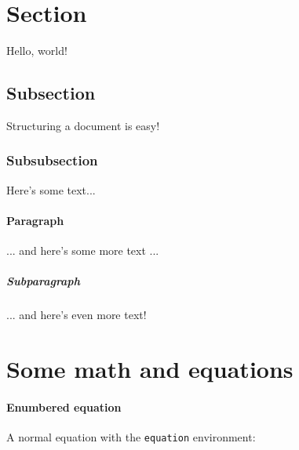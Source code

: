 \documentclass{article}
\begin{document}
\doublespacing          %

\maketitle
\newpage

\tableofcontents
\newpage

\listoffigures
\newpage

\listoftables
\newpage

\singlespacing

\section{Section}

Hello, world!

\subsection{Subsection}

Structuring a document is easy!

\subsubsection{Subsubsection}

Here's some text...

\paragraph{Paragraph}

... and here's some more text ...

\subparagraph{Subparagraph}

... and here's even more text!

\section{Some math and equations}

\paragraph{Enumbered equation}

A normal equation with the \texttt{equation} environment:
\end{document}
